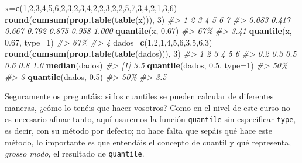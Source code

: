 \documentclass[
]{book}
\newenvironment{Shaded}{\begin{snugshade}}{\end{snugshade}}
\newcommand{\CommentTok}[1]{\textcolor[rgb]{0.56,0.35,0.01}{\textit{#1}}}
\newcommand{\DataTypeTok}[1]{\textcolor[rgb]{0.13,0.29,0.53}{#1}}
\newcommand{\DecValTok}[1]{\textcolor[rgb]{0.00,0.00,0.81}{#1}}
\newcommand{\FloatTok}[1]{\textcolor[rgb]{0.00,0.00,0.81}{#1}}
\newcommand{\KeywordTok}[1]{\textcolor[rgb]{0.13,0.29,0.53}{\textbf{#1}}}
\newcommand{\NormalTok}[1]{#1}
\theoremstyle{definition}
\theoremstyle{definition}
\theoremstyle{definition}
\theoremstyle{remark}
\begin{document}
\begin{Shaded}
\begin{Highlighting}[]
\NormalTok{x=}\KeywordTok{c}\NormalTok{(}\DecValTok{1}\NormalTok{,}\DecValTok{2}\NormalTok{,}\DecValTok{3}\NormalTok{,}\DecValTok{4}\NormalTok{,}\DecValTok{5}\NormalTok{,}\DecValTok{6}\NormalTok{,}\DecValTok{2}\NormalTok{,}\DecValTok{3}\NormalTok{,}\DecValTok{2}\NormalTok{,}\DecValTok{3}\NormalTok{,}\DecValTok{4}\NormalTok{,}\DecValTok{2}\NormalTok{,}\DecValTok{2}\NormalTok{,}\DecValTok{3}\NormalTok{,}\DecValTok{2}\NormalTok{,}\DecValTok{2}\NormalTok{,}\DecValTok{5}\NormalTok{,}\DecValTok{7}\NormalTok{,}\DecValTok{3}\NormalTok{,}\DecValTok{4}\NormalTok{,}\DecValTok{2}\NormalTok{,}\DecValTok{1}\NormalTok{,}\DecValTok{3}\NormalTok{,}\DecValTok{6}\NormalTok{)}
\KeywordTok{round}\NormalTok{(}\KeywordTok{cumsum}\NormalTok{(}\KeywordTok{prop.table}\NormalTok{(}\KeywordTok{table}\NormalTok{(x))), }\DecValTok{3}\NormalTok{)}
\CommentTok{\#\textgreater{}     1     2     3     4     5     6     7 }
\CommentTok{\#\textgreater{} 0.083 0.417 0.667 0.792 0.875 0.958 1.000}
\KeywordTok{quantile}\NormalTok{(x, }\FloatTok{0.67}\NormalTok{)}
\CommentTok{\#\textgreater{}  67\% }
\CommentTok{\#\textgreater{} 3.41}
\KeywordTok{quantile}\NormalTok{(x, }\FloatTok{0.67}\NormalTok{, }\DataTypeTok{type=}\DecValTok{1}\NormalTok{)}
\CommentTok{\#\textgreater{} 67\% }
\CommentTok{\#\textgreater{}   4}
\NormalTok{dados=}\KeywordTok{c}\NormalTok{(}\DecValTok{1}\NormalTok{,}\DecValTok{2}\NormalTok{,}\DecValTok{1}\NormalTok{,}\DecValTok{4}\NormalTok{,}\DecValTok{5}\NormalTok{,}\DecValTok{6}\NormalTok{,}\DecValTok{3}\NormalTok{,}\DecValTok{5}\NormalTok{,}\DecValTok{6}\NormalTok{,}\DecValTok{3}\NormalTok{)}
\KeywordTok{round}\NormalTok{(}\KeywordTok{cumsum}\NormalTok{(}\KeywordTok{prop.table}\NormalTok{(}\KeywordTok{table}\NormalTok{(dados))), }\DecValTok{3}\NormalTok{)}
\CommentTok{\#\textgreater{}   1   2   3   4   5   6 }
\CommentTok{\#\textgreater{} 0.2 0.3 0.5 0.6 0.8 1.0}
\KeywordTok{median}\NormalTok{(dados)}
\CommentTok{\#\textgreater{} [1] 3.5}
\KeywordTok{quantile}\NormalTok{(dados, }\FloatTok{0.5}\NormalTok{, }\DataTypeTok{type=}\DecValTok{1}\NormalTok{)}
\CommentTok{\#\textgreater{} 50\% }
\CommentTok{\#\textgreater{}   3}
\KeywordTok{quantile}\NormalTok{(dados, }\FloatTok{0.5}\NormalTok{)}
\CommentTok{\#\textgreater{} 50\% }
\CommentTok{\#\textgreater{} 3.5}
\end{Highlighting}
\end{Shaded}

Seguramente os preguntáis: si los cuantiles se pueden calcular de diferentes maneras, ¿cómo lo tenéis que hacer vosotros? Como en el nivel de este curso no es necesario afinar tanto, aquí usaremos la función \texttt{quantile} sin especificar \texttt{type}, es decir, con su método por defecto; no hace falta que sepáis qué hace este método, lo importante es que entendáis el concepto de cuantil y qué representa, \emph{grosso modo}, el resultado de \texttt{quantile}.
\end{document}
